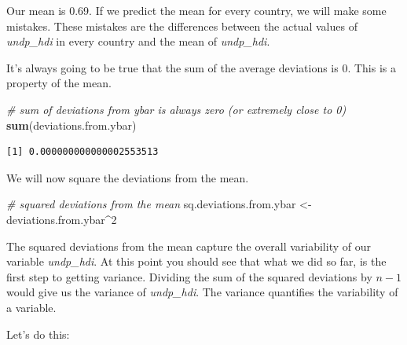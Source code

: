 \documentclass[]{article}
\newenvironment{Shaded}{\begin{snugshade}}{\end{snugshade}}
\newcommand{\KeywordTok}[1]{\textcolor[rgb]{0.13,0.29,0.53}{\textbf{#1}}}
\newcommand{\DecValTok}[1]{\textcolor[rgb]{0.00,0.00,0.81}{#1}}
\newcommand{\StringTok}[1]{\textcolor[rgb]{0.31,0.60,0.02}{#1}}
\newcommand{\CommentTok}[1]{\textcolor[rgb]{0.56,0.35,0.01}{\textit{#1}}}
\newcommand{\OperatorTok}[1]{\textcolor[rgb]{0.81,0.36,0.00}{\textbf{#1}}}
\newcommand{\NormalTok}[1]{#1}
\theoremstyle{definition}
\theoremstyle{definition}
\theoremstyle{definition}
\theoremstyle{remark}
\begin{document}
Our mean is 0.69. If we predict the mean for every country, we will make
some mistakes. These mistakes are the differences between the actual
values of \emph{undp\_hdi} in every country and the mean of
\emph{undp\_hdi}.

\begin{Shaded}
\end{Shaded}

It's always going to be true that the sum of the average deviations is
0. This is a property of the mean.

\begin{Shaded}
\begin{Highlighting}[]
\CommentTok{# sum of deviations from ybar is always zero (or extremely close to 0)}
\KeywordTok{sum}\NormalTok{(deviations.from.ybar)}
\end{Highlighting}
\end{Shaded}

\begin{verbatim}
[1] 0.000000000000002553513
\end{verbatim}

We will now square the deviations from the mean.

\begin{Shaded}
\begin{Highlighting}[]
\CommentTok{# squared deviations from the mean}
\NormalTok{sq.deviations.from.ybar <-}\StringTok{ }\NormalTok{deviations.from.ybar}\OperatorTok{^}\DecValTok{2}
\end{Highlighting}
\end{Shaded}

The squared deviations from the mean capture the overall variability of
our variable \emph{undp\_hdi}. At this point you should see that what we
did so far, is the first step to getting variance. Dividing the sum of
the squared deviations by \(n-1\) would give us the variance of
\emph{undp\_hdi}. The variance quantifies the variability of a variable.

Let's do this:

\begin{Shaded}
\end{Shaded}
\end{document}
